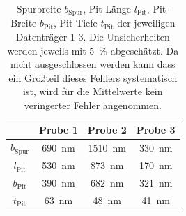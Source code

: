 \documentclass[
	a4paper,
	12pt,
	pagesize,
	ngerman
]{scrartcl}
\begin{document}
\begin{table}[H]
		\centering
		\begin{tabular}{ c | c | c | c }
			 & Probe 1 & Probe 2 & Probe 3\\ \hline
			$b_\text{Spur}$ & \SI{690}{nm} & \SI{1510}{nm} &\SI{330}{nm} \\
			$l_\text{Pit}$ & \SI{530}{nm} & \SI{873}{nm} &\SI{170}{nm} \\
			$b_\text{Pit}$ & \SI{390}{nm} & \SI{682}{nm} &\SI{321}{nm} \\
			$t_\text{Pit}$ & \SI{63}{nm} & \SI{48}{nm} &\SI{41}{nm} \\
		\end{tabular}
		\caption{Spurbreite $b_\text{Spur}$, Pit-Länge $l_\text{Pit}$, Pit-Breite $b_\text{Pit}$, Pit-Tiefe $t_\text{Pit}$ der jeweiligen Datenträger 1-3.
		Die Unsicherheiten werden jeweils mit \SI{5}{\%} abgeschätzt.
		Da nicht ausgeschlossen werden kann dass ein Großteil dieses Fehlers systematisch ist, wird für die Mittelwerte kein veringerter Fehler angenommen.}
		\label{tb_spur}
	\end{table}

\end{document}
